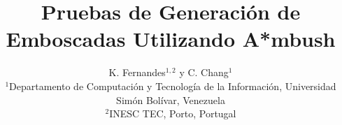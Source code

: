 \documentclass{egpubl}
\title[Ambush]%
      {Pruebas de Generaci\'on de Emboscadas Utilizando A*mbush}
\author[K. Fernandes \& C. Chang]
       {K. Fernandes$^{1,2}$
        y C. Chang$^{1}$
        \\
         $^1$Departamento de Computaci\'on y Tecnolog\'ia de la
         Informaci\'on, Universidad Sim\'on Bol\'ivar, Venezuela\\
         $^2$INESC TEC, Porto, Portugal
      }
\begin{document}
\noEGpagenumber

\maketitle








%



\end{document}
